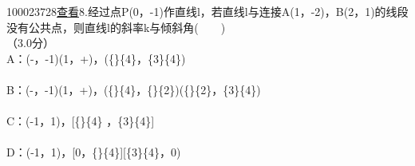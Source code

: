 \documentclass[a4paper,11pt]{article}
\begin{document}
 \hspace*{0.333em}100023728\hspace*{0.333em}\hspace*{0.333em}\href{../question/viewQuestionDetail.jsp?questionID=100023728&amp;testPaperId=100229072}{查看}\hspace*{0.333em}\hspace*{0.333em}8.经过点P(0，-1)作直线l，若直线l与连接A(1，-2)，B(2，1)的线段没有公共点，则直线l的斜率k与倾斜角(　　) \\
\hspace*{0.333em}\hspace*{0.333em}（3.0分）\\
\hspace*{0.333em}\hspace*{0.333em}\hspace*{0.333em}\hspace*{0.333em}\hspace*{0.333em}\hspace*{0.333em}\hspace*{0.333em}\hspace*{0.333em}A：(-\infty，-1)\cup(1，+\infty)，(\frac\{\pi\}\{4\}，\frac\{3\pi\}\{4\}) \\
\\
\hspace*{0.333em}\hspace*{0.333em}\hspace*{0.333em}\hspace*{0.333em}\hspace*{0.333em}\hspace*{0.333em}\hspace*{0.333em}\hspace*{0.333em}B：(-\infty，-1)\cup(1，+\infty)，(\frac\{\pi\}\{4\}，\frac\{\pi\}\{2\})\cup(\frac\{\pi\}\{2\}，\frac\{3\pi\}\{4\}) \\
\\
\hspace*{0.333em}\hspace*{0.333em}\hspace*{0.333em}\hspace*{0.333em}\hspace*{0.333em}\hspace*{0.333em}\hspace*{0.333em}\hspace*{0.333em}C：(-1，1)，[\frac\{\pi\}\{4\} ，\frac\{3\pi\}\{4\}]\\
\\
\hspace*{0.333em}\hspace*{0.333em}\hspace*{0.333em}\hspace*{0.333em}\hspace*{0.333em}\hspace*{0.333em}\hspace*{0.333em}\hspace*{0.333em}D：(-1，1)，[0，\frac\{\pi\}\{4\}]\cup[\frac\{3\pi\}\{4\}，0) \\
\\
\end{document}
